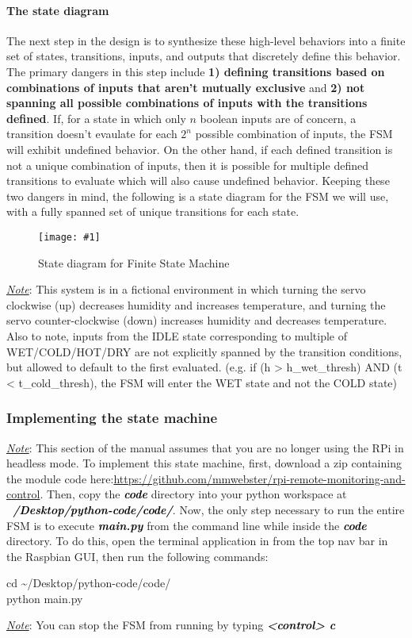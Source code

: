 \documentclass{article}
\newcommand*{\myfont}{\fontfamily{pcr}\selectfont}
\newcommand{\codeb}[2]{
  \begin{tcolorbox}[width=\textwidth,colback={SpringGreen},title={#1},colbacktitle=darkgreen,coltitle=SpringGreen]
    \myfont
    #2
  \end{tcolorbox}
} %
\newcommand{\loc}[1]{\textit{\textcolor{Black}{\textbf{#1}}}} %
\newcommand{\imagefigb}[2]{
    \begin{figure}[H]
        \centering
        \texttt{[image: \#1]}
        \caption{#2}
    \end{figure}
}
\newcommand{\note}[1]{\underline{\textit{Note}}: #1}
\begin{document}
    \paragraph{The state diagram}
      The next step in the design is to synthesize these high-level behaviors into a finite set of states, transitions, inputs, and outputs that discretely define this behavior. The primary dangers in this step include \textbf{1) defining transitions based on combinations of inputs that aren't mutually exclusive} and \textbf{2) not spanning all possible combinations of inputs with the transitions defined}. If, for a state in which only $n$ boolean inputs are of concern, a transition doesn't evaulate for each $2^n$ possible combination of inputs, the FSM will exhibit undefined behavior. On the other hand, if each defined transition is not a unique combination of inputs, then it is possible for multiple defined transitions to evaluate which will also cause undefined behavior. Keeping these two dangers in mind, the following is a state diagram for the FSM we will use, with a fully spanned set of unique transitions for each state.
      \imagefigb{fsm-slab.png}{State diagram for Finite State Machine}
      \noindent
      \note{This system is in a fictional environment in which turning the servo clockwise (up) decreases humidity and increases temperature, and turning the servo counter-clockwise (down) increases humidity and decreases temperature. Also to note, inputs from the IDLE state corresponding to multiple of WET/COLD/HOT/DRY are not explicitly spanned by the transition conditions, but allowed to default to the first evaluated. (e.g. if (h > h\_wet\_thresh) AND (t < t\_cold\_thresh), the FSM will enter the WET state and not the COLD state)}
  \subsubsection{Implementing the state machine}
    \underline{\textit{Note}}: This section of the manual assumes that you are no longer using the RPi in headless mode.
    \newline\newline \noindent
    To implement this state machine, first, download a zip containing the module code here:\newline \url{https://github.com/mmwebster/rpi-remote-monitoring-and-control}. Then, copy the \loc{code} directory into your python workspace at \loc{~/Desktop/python-code/code/}. Now, the only step necessary to run the entire FSM is to execute \loc{main.py} from the command line while inside the \loc{code} directory. To do this, open the terminal application in from the top nav bar in the Raspbian GUI, then run the following commands:
    \codeb{Run the FSM}{
      cd \textasciitilde/Desktop/python-code/code/ \\
      python main.py
    }
    \newline
    \note{You can stop the FSM from running by typing \loc{<control> c}}
\end{document}

